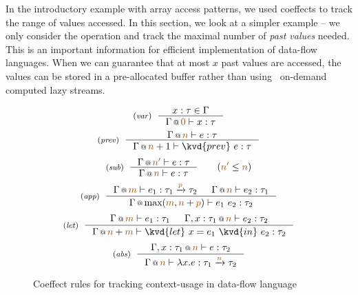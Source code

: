 In the introductory example with array access patterns, we used coeffects to track the range
of values accessed. In this section, we look at a simpler example -- we only consider the
 operation and track the maximal number of \emph{past values} needed. This is an 
important information for efficient implementation of data-flow languages. When we can guarantee
that at most $x$ past values are accessed, the values can be stored in a pre-allocated buffer
rather than using \eg~on-demand computed lazy streams.



\begin{figure}[t]
\begin{equation*}
\tyrule{var}
  {x : \tau \in \Gamma}
  {\coctx{\Gamma}{\aclrd{ 0 }} \vdash x : \tau }
\end{equation*}
\begin{equation*}
\tyrule{prev}
  {\coctx{\Gamma}{ \aclrd{n} } \vdash e : \tau}
  {\coctx{\Gamma}{ \aclrd{n}+1} \vdash \kvd{prev}~e : \tau}
\end{equation*}
\begin{equation*}
\tyrule{sub}
  {\coctx{\Gamma}{\aclrd{n'}} \vdash e : \tau }
  {\coctx{\Gamma}{\aclrd{n}} \vdash e : \tau }\quad\quad(\aclrd{n'} \leq \aclrd{n})
\end{equation*}
\begin{equation*}
\tyrule{app}
  {\coctx{\Gamma}{\aclrd{m}} \vdash e_1 : \tau_1 \xrightarrow{\aclrd{p}} \tau_2 &
   \coctx{\Gamma}{\aclrd{n}} \vdash e_2 : \tau_1 }
  {\coctx{\Gamma}{\textnormal{max}(\aclrd{m}, \aclrd{n} + \aclrd{p})} \vdash e_1~e_2 : \tau_2}
\end{equation*}
\begin{equation*}
\tyrule{let}
  { \coctx{\Gamma}{\aclrd{m}} \vdash e_1 : \tau_1 &
    \coctx{\Gamma, x:\tau_1}{\aclrd{n}} \vdash e_2 : \tau_2}
  {\coctx{\Gamma}{\aclrd{n}+\aclrd{m}} \vdash \kvd{let}~x=e_1~\kvd{in}~e_2 : \tau_2 }
\end{equation*}
\begin{equation*}
\tyrule{abs}
  {\coctx{\Gamma, x:\tau_1}{\aclrd{n}} \vdash e : \tau_2}
  {\coctx{\Gamma}{\aclrd{n}} \vdash \lambda x.e : \tau_1 \xrightarrow{\aclrd{n}} \tau_2 }
\end{equation*}

\caption{Coeffect rules for tracking context-usage in data-flow language}
\label{fig:applications-flat-dataflow}
\end{figure}

